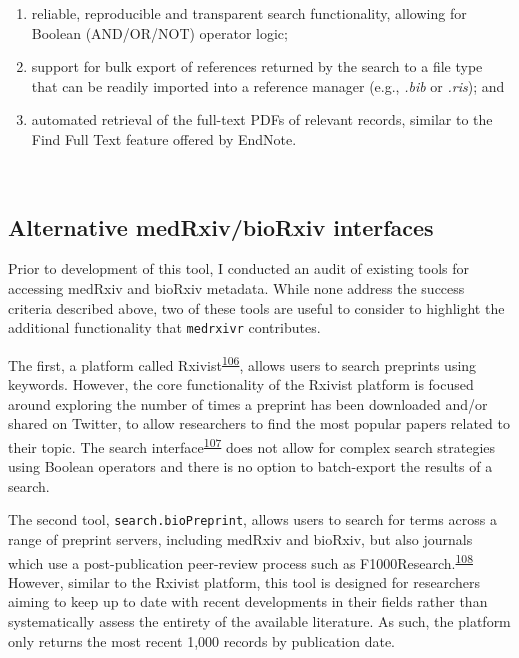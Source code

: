 \documentclass[a4paper, twoside]{templates/ociamthesis}
\begin{document}
\begin{enumerate}
\def\labelenumi{\arabic{enumi}.}
\item
  reliable, reproducible and transparent search functionality, allowing for Boolean (AND/OR/NOT) operator logic;
\item
  support for bulk export of references returned by the search to a file type that can be readily imported into a reference manager (e.g., \emph{.bib} or \emph{.ris}); and
\item
  automated retrieval of the full-text PDFs of relevant records, similar to the Find Full Text feature offered by EndNote.
\end{enumerate}

~

\hypertarget{alternative-medrxivbiorxiv-interfaces}{%
\subsection{Alternative medRxiv/bioRxiv interfaces}\label{alternative-medrxivbiorxiv-interfaces}}

Prior to development of this tool, I conducted an audit of existing tools for accessing medRxiv and bioRxiv metadata. While none address the success criteria described above, two of these tools are useful to consider to highlight the additional functionality that \texttt{medrxivr} contributes.

The first, a platform called Rxivist\textsuperscript{\protect\hyperlink{ref-abdill2019}{106}}, allows users to search preprints using keywords. However, the core functionality of the Rxivist platform is focused around exploring the number of times a preprint has been downloaded and/or shared on Twitter, to allow researchers to find the most popular papers related to their topic. The search interface\textsuperscript{\protect\hyperlink{ref-zotero-15027}{107}} does not allow for complex search strategies using Boolean operators and there is no option to batch-export the results of a search.

The second tool, \texttt{search.bioPreprint}, allows users to search for terms across a range of preprint servers, including medRxiv and bioRxiv, but also journals which use a post-publication peer-review process such as F1000Research.\textsuperscript{\protect\hyperlink{ref-iwema2016}{108}} However, similar to the Rxivist platform, this tool is designed for researchers aiming to keep up to date with recent developments in their fields rather than systematically assess the entirety of the available literature. As such, the platform only returns the most recent 1,000 records by publication date.
\end{document}
